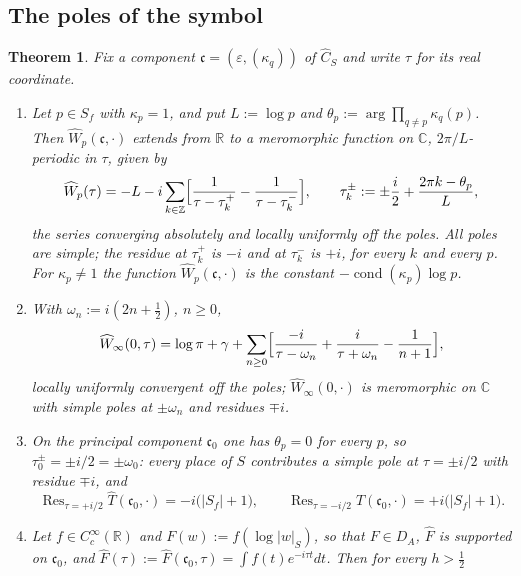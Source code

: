 \documentclass[11pt]{amsart}
\newtheorem{theorem}{Theorem}[section]
\theoremstyle{definition}
\theoremstyle{remark}
\newcommand{\C}{\mathbb C}
\newcommand{\R}{\mathbb R}
\newcommand{\Z}{\mathbb Z}
\newcommand{\Res}{\operatorname{Res}}
\newcommand{\Th}{\widehat{T}}
\newcommand{\Wh}{\widehat{W}}
\newcommand{\Ch}{\widehat{C}_S}
\newcommand{\DA}{D_A}
\newcommand{\cond}{\operatorname{cond}}
\begin{document}
\subsection{The poles of the symbol}

\begin{theorem}\label{thm:ML}
Fix a component $\mathfrak c=(\varepsilon,(\kappa_q))$ of $\Ch$ and write
$\tau$ for its real coordinate.
\begin{enumerate}
\item[(a)] Let $p\in S_f$ with $\kappa_p=1$, and put $L:=\log p$ and
$\theta_p:=\arg\prod_{q\ne p}\kappa_q(p)$.  Then $\Wh_p(\mathfrak c,\cdot)$
extends from $\R$ to a meromorphic function on $\C$, $2\pi/L$-periodic in
$\tau$, given by
\begin{equation}\label{eq:MLp}
\Wh_p(\tau)=-L-i\sum_{k\in\Z}
\Bigl[\frac{1}{\tau-\tau_k^{+}}-\frac{1}{\tau-\tau_k^{-}}\Bigr],
\qquad \tau_k^{\pm}:=\pm\frac{i}{2}+\frac{2\pi k-\theta_p}{L},
\end{equation}
the series converging absolutely and locally uniformly off the poles.
All poles are simple; the residue at $\tau_k^{+}$ is $-i$ and at $\tau_k^{-}$
is $+i$, for every $k$ and every $p$.  For $\kappa_p\ne1$ the function
$\Wh_p(\mathfrak c,\cdot)$ is the constant $-\cond(\kappa_p)\log p$.
\item[(b)] With $\omega_n:=i(2n+\tfrac12)$, $n\ge0$,
\begin{equation}\label{eq:MLinf}
\Wh_{\infty}(0,\tau)=\log\pi+\gamma+\sum_{n\ge0}
\Bigl[\frac{-i}{\tau-\omega_n}+\frac{i}{\tau+\omega_n}-\frac{1}{n+1}\Bigr],
\end{equation}
locally uniformly convergent off the poles; $\Wh_{\infty}(0,\cdot)$ is
meromorphic on $\C$ with simple poles at $\pm\omega_n$ and residues $\mp i$.
\item[(c)] On the principal component $\mathfrak c_0$ one has $\theta_p=0$ for
every $p$, so $\tau_0^{\pm}=\pm i/2=\pm\omega_0$: every place of $S$
contributes a simple pole at $\tau=\pm i/2$ with residue $\mp i$, and
\begin{equation}\label{eq:residues}
\Res_{\tau=+i/2}\Th(\mathfrak c_0,\cdot)=-i\bigl(|S_f|+1\bigr),\qquad
\Res_{\tau=-i/2}\Th(\mathfrak c_0,\cdot)=+i\bigl(|S_f|+1\bigr).
\end{equation}
\item[(d)] Let $f\in C_c^{\infty}(\R)$ and $F(w):=f(\log|w|_S)$, so that
$F\in\DA$, $\widehat F$ is supported on $\mathfrak c_0$, and
$\widehat F(\tau):=\widehat F(\mathfrak c_0,\tau)=\int f(t)e^{-i\tau t}dt$.
Then for every $h>\tfrac12$

\end{enumerate}
\end{theorem}
\end{document}
